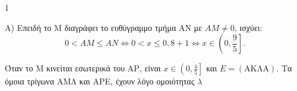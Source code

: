 \begin{ylh}{1}
    \item [ΛΥΣΗ]
\end{ylh}
\begin{alist}
\item Α) Επειδή το Μ διαγράφει το ευθύγραμμο τμήμα ΑΝ με $AM \ne 0$, ισχύει:
\[ 0 < AM \le AN \Leftrightarrow 0 < x \le 0,8 + 1 \Leftrightarrow x \in \left(0, \frac{9}{5}\right]. \]
\begin{rlist}
\item Όταν το Μ κινείται εσωτερικά του ΑΡ, είναι $x \in \left(0, \frac{4}{5}\right]$ και $E=(\text{AKΛA})$. Τα όμοια τρίγωνα ΑΜΛ και ΑΡΕ, έχουν λόγο ομοιότητας $\lambda$
\begin{figure} %
\end{figure}
\end{rlist}
\end{alist}
